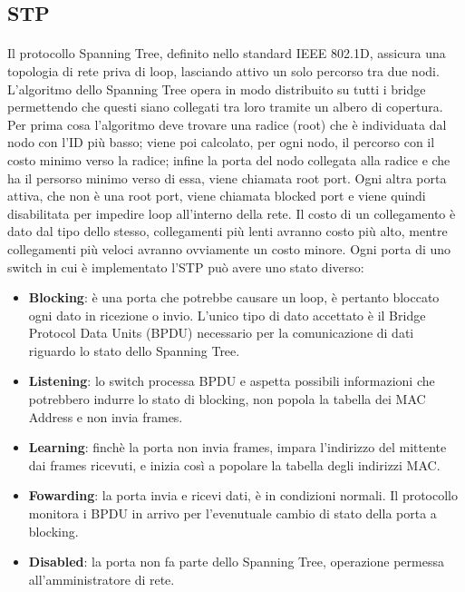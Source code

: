 \subsection{STP}
\paragraph{} Il protocollo Spanning Tree, definito nello standard IEEE 802.1D, assicura una topologia di rete priva di loop, lasciando attivo un solo percorso tra due nodi. L'algoritmo dello Spanning Tree opera in modo distribuito su tutti i bridge permettendo che questi siano collegati tra loro tramite un albero di copertura. Per prima cosa l'algoritmo deve trovare una radice (root) che è individuata dal nodo con l'ID più basso; viene poi calcolato, per ogni nodo, il percorso con il costo minimo verso la radice; infine la porta del nodo collegata alla radice e che ha il persorso minimo verso di essa, viene chiamata root port. Ogni altra porta attiva, che non è una root port, viene chiamata blocked port e viene quindi disabilitata per impedire loop all'interno della rete. Il costo di un collegamento è dato dal tipo dello stesso,
collegamenti più lenti avranno costo più alto, mentre collegamenti più veloci avranno ovviamente un costo minore.
Ogni porta di uno switch in cui è implementato l’STP può avere uno stato diverso:
\begin{itemize}
	\item \textbf{Blocking}: è una porta che potrebbe causare un loop, è pertanto bloccato ogni dato in ricezione o invio. L’unico tipo di dato accettato è il Bridge Protocol Data Units (BPDU) necessario per la comunicazione di dati riguardo lo stato dello Spanning Tree.
	\item \textbf{Listening}: lo switch processa BPDU e aspetta possibili informazioni che potrebbero indurre lo stato di blocking, non popola la tabella dei MAC Address e non invia frames.
	\item \textbf{Learning}: finchè la porta non invia frames, impara l’indirizzo del mittente dai frames ricevuti, e inizia così a popolare la tabella degli indirizzi MAC.
	\item \textbf{Fowarding}: la porta invia e ricevi dati, è in condizioni normali. Il protocollo monitora i BPDU in arrivo per l’evenutuale cambio di stato della porta a blocking.
	\item \textbf{Disabled}: la porta non fa parte dello Spanning Tree, operazione permessa all’amministratore di rete.
\end{itemize}
